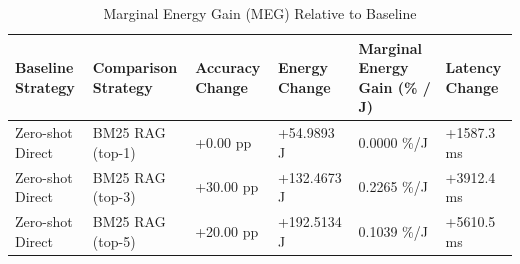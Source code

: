 \begin{table}
\caption{Marginal Energy Gain (MEG) Relative to Baseline}
\label{tab:marginal_energy_gain}
\begin{tabular}{llllll}
\toprule
Baseline Strategy & Comparison Strategy & Accuracy Change & Energy Change & Marginal Energy Gain (\% / J) & Latency Change \\
\midrule
Zero-shot Direct & BM25 RAG (top-1) & +0.00 pp & +54.9893 J & 0.0000 \%/J & +1587.3 ms \\
Zero-shot Direct & BM25 RAG (top-3) & +30.00 pp & +132.4673 J & 0.2265 \%/J & +3912.4 ms \\
Zero-shot Direct & BM25 RAG (top-5) & +20.00 pp & +192.5134 J & 0.1039 \%/J & +5610.5 ms \\
\bottomrule
\end{tabular}
\end{table}
